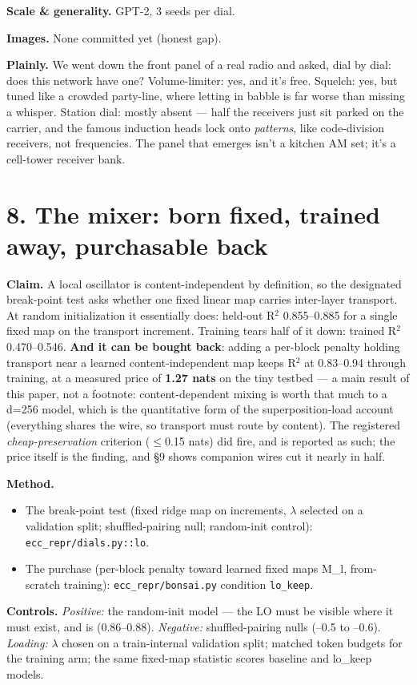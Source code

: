 \documentclass[10pt]{article}
\begin{document}
\textbf{Scale \& generality.} GPT-2, 3 seeds per dial.

\textbf{Images.} None committed yet (honest gap).

\textbf{Plainly.} We went down the front panel of a real radio and asked, dial by dial: does this
network have one? Volume-limiter: yes, and it's free. Squelch: yes, but tuned like a crowded
party-line, where letting in babble is far worse than missing a whisper. Station dial: mostly
absent --- half the receivers just sit parked on the carrier, and the famous induction heads lock
onto \emph{patterns}, like code-division receivers, not frequencies. The panel that emerges isn't a
kitchen AM set; it's a cell-tower receiver bank.

\section{8. The mixer: born fixed, trained away, purchasable back}

\textbf{Claim.} A local oscillator is content-independent by definition, so the designated break-point
test asks whether one fixed linear map carries inter-layer transport. At random initialization it
essentially does: held-out R$^{2}$ 0.855--0.885 for a single fixed map on the transport increment.
Training tears half of it down: trained R$^{2}$ 0.470--0.546. \textbf{And it can be bought back}: adding a
per-block penalty holding transport near a learned content-independent map keeps R$^{2}$ at 0.83--0.94
through training, at a measured price of \textbf{1.27 nats} on the tiny testbed --- a main result of this
paper, not a footnote: content-dependent mixing is worth that much to a d=256 model, which is the
quantitative form of the superposition-load account (everything shares the wire, so transport must
route by content). The registered \emph{cheap-preservation} criterion ($\le$0.15 nats) did fire, and is
reported as such; the price itself is the finding, and §9 shows companion wires cut it nearly in
half.

\textbf{Method.}
\begin{itemize}\setlength\itemsep{1pt}
\item The break-point test (fixed ridge map on increments, $\lambda$ selected on a validation split; shuffled-pairing null; random-init control): \texttt{ecc\_repr/dials.py::lo}.
\item The purchase (per-block penalty toward learned fixed maps M\_l, from-scratch training): \texttt{ecc\_repr/bonsai.py} condition \texttt{lo\_keep}.
\end{itemize}
\textbf{Controls.} \emph{Positive:} the random-init model --- the LO must be visible where it must exist, and
is (0.86--0.88). \emph{Negative:} shuffled-pairing nulls (--0.5 to --0.6). \emph{Loading:} $\lambda$ chosen on a
train-internal validation split; matched token budgets for the training arm; the same fixed-map
statistic scores baseline and lo\_keep models.
\end{document}
